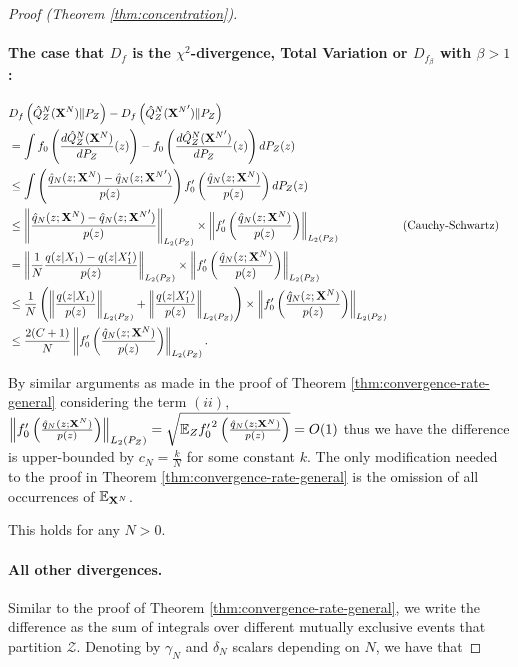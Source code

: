 \begin{proof}[Proof (Theorem \ref{thm:concentration})]
\paragraph{The case that $D_f$ is the $\chi^2$-divergence, Total Variation or $D_{f_\beta}$ with $\beta>1$:}
\begin{align*}
    & D_f\left( \hat{Q}_Z^N(\mathbf{X}^N) \| P_Z\right) - D_f\left( \hat{Q}_Z^N({\mathbf{X}^N}') \| P_Z\right)  \\
    &= \int f_0\left( \frac{d\hat{Q}_Z^N(\mathbf{X}^N)}{dP_Z}(z) \right) - f_0\left( \frac{d\hat{Q}_Z^N({\mathbf{X}^N}')}{dP_Z}(z) \right) dP_Z(z)  \\
    &\leq \int \left( \frac{\hat{q}_N(z;\mathbf{X}^N) - \hat{q}_N(z;{\mathbf{X}^N}')}{p(z)} \right)     f'_0\left(\frac{\hat{q}_N(z;\mathbf{X}^N)}{p(z)} \right) dP_Z(z)  \\
    &\leq \left\| \frac{\hat{q}_N(z;\mathbf{X}^N) - \hat{q}_N(z;{\mathbf{X}^N}')}{p(z)} \right\|_{L_2(P_Z)} \times \left\| f'_0\left(\frac{\hat{q}_N(z;\mathbf{X}^N)}{p(z)}\right) \right\|_{L_2(P_Z)}
    && \text{ (Cauchy-Schwartz)}\\
    &= \left\| \frac{1}{N} \frac{q(z|X_1) - q(z|X'_1)}{p(z)} \right\|_{L_2(P_Z)} \times \left\| f'_0\left(\frac{\hat{q}_N(z;\mathbf{X}^N)}{p(z)}\right) \right\|_{L_2(P_Z)} \\
    &\leq \frac{1}{N} \left( \left\| \frac{q(z|X_1)}{p(z)}\right\|_{L_2(P_Z)} + \left\|\frac{q(z|X'_1)}{p(z)} \right\|_{L_2(P_Z)} \right)\times \left\| f'_0\left(\frac{\hat{q}_N(z;\mathbf{X}^N)}{p(z)}\right) \right\|_{L_2(P_Z)} \\
    &\leq \frac{2(C+1)}{N} \left\| f'_0\left(\frac{\hat{q}_N(z;\mathbf{X}^N)}{p(z)}\right) \right\|_{L_2(P_Z)}.
\end{align*}

By similar arguments as made in the proof of Theorem \ref{thm:convergence-rate-general} considering the term $(ii)$, $\left\| f_0'\left(\frac{\hat{q}_N(z;\mathbf{X}^N)}{p(z)}\right) \right\|_{L_2(P_Z)} = \sqrt{\mathbb{E}_Z {f'_0}^2\left(\frac{\hat{q}_N(z;\mathbf{X}^N)}{p(z)}\right)} = O(1)$ thus we have the difference is upper-bounded by $c_N = \frac{k}{N}$ for some constant $k$.
The only modification needed to the proof in Theorem \ref{thm:convergence-rate-general} is the omission of all occurrences of $\mathbb{E}_{\mathbf{X}^N}$.

This holds for any $N>0$.

\paragraph{All other divergences.}

Similar to the proof of Theorem \ref{thm:convergence-rate-general},
we write the difference as the sum of integrals over different mutually exclusive events that partition $\mathcal{Z}$.
Denoting by $\gamma_N$ and $\delta_N$ scalars depending on $N$, we have that


\end{proof}
